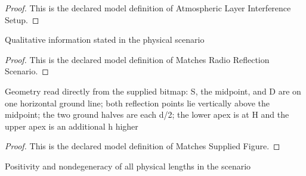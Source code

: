 \begin{proof}
  This is the declared model definition of Atmospheric Layer Interference Setup.
\end{proof}
\begin{definition}
  \label{def:physics:phyx-mini-0329:phyxminiproblems-problemphyxmini0329-matchesradioreflectionscenario}
  Qualitative information stated in the physical scenario
\end{definition}
\begin{proof}
  This is the declared model definition of Matches Radio Reflection Scenario.
\end{proof}
\begin{definition}
  \label{def:physics:phyx-mini-0329:phyxminiproblems-problemphyxmini0329-matchessuppliedfigure}
  Geometry read directly from the supplied bitmap: S, the midpoint, and D are on one horizontal ground line; both reflection points lie vertically above the midpoint; the two ground halves are each d/2; the lower apex is at H and the upper apex is an additional h higher
\end{definition}
\begin{proof}
  This is the declared model definition of Matches Supplied Figure.
\end{proof}
\begin{definition}
  \label{def:physics:phyx-mini-0329:phyxminiproblems-problemphyxmini0329-hasphysicalparameters}
  Positivity and nondegeneracy of all physical lengths in the scenario
\end{definition}
